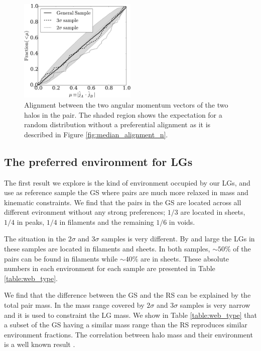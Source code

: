 \documentclass{emulateapj}
\begin{document}
\begin{figure}
\begin{center}
  \includegraphics[width=0.50\textwidth]{fig6.pdf}
\end{center}
\caption{Alignment between the two angular momentum vectors of the two
  halos in the pair.
  The shaded region shows the expectation for a random
  distribution without a preferential alignment as it is described in
  Figure \ref{fig:median_alignment_n}.
    \label{fig:jj_alignment}}  
\end{figure}



\subsection{The preferred environment for LGs}

The first result we explore is the kind of environment occupied by
our LGs, and use as reference sample the GS where pairs are much more
relaxed in mass and kinematic constraints.
We find that the pairs in the GS are located across all different
evironment without any strong preferences; $1/3$  are located in
sheets, $1/4$ in peaks, $1/4$ in filaments and the remaining $1/6$ in
voids.  

The situation in the $2\sigma$ and $3\sigma$ samples is very
different. 
By and large the LGs in these samples are located in filaments and sheets. 
In both samples, $\sim 50\%$ of the pairs can be found in filaments
while $\sim 40\%$ are in sheets. 
These absolute numbers in each environment for each sample are
presented in Table \ref{table:web_type}.  

We find that the difference between the GS and the RS 
can be explained by the total pair mass.
In \citet{lganalogues} the mass range covered by $2\sigma$ and $3\sigma$ 
samples is very narrow and it is used to constraint the LG mass.
We show in Table \ref{table:web_type} that a subset of the GS
having a similar mass range than the RS reproduces similar environment
fractions. The correlation between halo mass and their environment is a
well known result \citep{1998ApJ...500...14L}.
\end{document}
